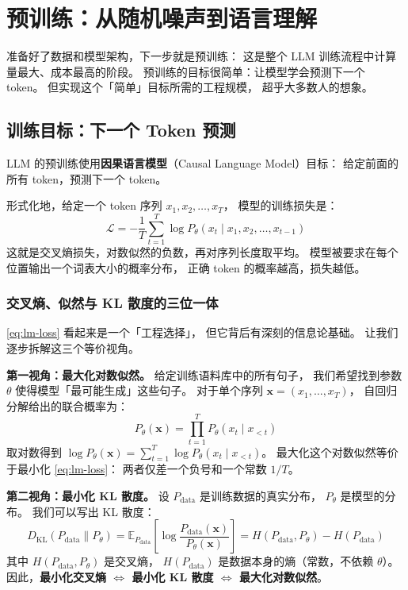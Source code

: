 \chapter{预训练：从随机噪声到语言理解}
\label{ch:pretrain}

准备好了数据和模型架构，下一步就是预训练：
这是整个 LLM 训练流程中计算量最大、成本最高的阶段。
预训练的目标很简单：让模型学会预测下一个 token。
但实现这个「简单」目标所需的工程规模，
超乎大多数人的想象。

\section{训练目标：下一个 Token 预测}

LLM 的预训练使用\textbf{因果语言模型}（Causal Language Model）目标：
给定前面的所有 token，预测下一个 token。

形式化地，给定一个 token 序列 $x_1, x_2, \ldots, x_T$，
模型的训练损失是：
\begin{equation}
  \mathcal{L} = -\frac{1}{T} \sum_{t=1}^{T}
  \log P_\theta(x_t \mid x_1, x_2, \ldots, x_{t-1})
  \label{eq:lm-loss}
\end{equation}
这就是交叉熵损失，对数似然的负数，再对序列长度取平均。
模型被要求在每个位置输出一个词表大小的概率分布，
正确 token 的概率越高，损失越低。

\subsection{交叉熵、似然与 KL 散度的三位一体}

\cref{eq:lm-loss} 看起来是一个「工程选择」，
但它背后有深刻的信息论基础。
让我们逐步拆解这三个等价视角。

\textbf{第一视角：最大化对数似然。}
给定训练语料库中的所有句子，
我们希望找到参数 $\theta$ 使得模型「最可能生成」这些句子。
对于单个序列 $\mathbf{x} = (x_1, \ldots, x_T)$，
自回归分解给出的联合概率为：
\begin{equation}
  P_\theta(\mathbf{x})
  = \prod_{t=1}^{T} P_\theta(x_t \mid x_{<t})
  \label{eq:autoregressive-decomp}
\end{equation}
取对数得到 $\log P_\theta(\mathbf{x}) = \sum_{t=1}^T \log P_\theta(x_t \mid x_{<t})$。
最大化这个对数似然等价于最小化 \cref{eq:lm-loss}：
两者仅差一个负号和一个常数 $1/T$。

\textbf{第二视角：最小化 KL 散度。}
设 $P_{\mathrm{data}}$ 是训练数据的真实分布，
$P_\theta$ 是模型的分布。
我们可以写出 KL 散度：
\begin{equation}
  D_{\mathrm{KL}}(P_{\mathrm{data}} \| P_\theta)
  = \mathbb{E}_{P_{\mathrm{data}}} \left[
    \log \frac{P_{\mathrm{data}}(\mathbf{x})}{P_\theta(\mathbf{x})}
  \right]
  = H(P_{\mathrm{data}}, P_\theta) - H(P_{\mathrm{data}})
\end{equation}
其中 $H(P_{\mathrm{data}}, P_\theta)$ 是交叉熵，
$H(P_{\mathrm{data}})$ 是数据本身的熵（常数，不依赖 $\theta$）。
因此，\textbf{最小化交叉熵 $\Leftrightarrow$ 最小化 KL 散度
$\Leftrightarrow$ 最大化对数似然}。

